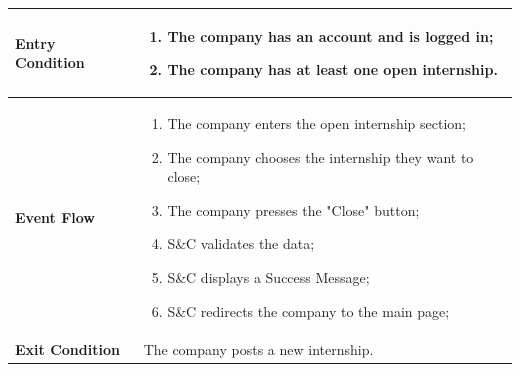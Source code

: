 \begin{enumerate}[label=\textbf{[US\arabic*]}, left = 0pt, align = left, resume]
\begin{longtable}{|l|p{11cm}|}
                \textbf{Entry Condition} & 
                    \begin{enumerate}[label=\textbullet, itemsep=0em]
                        \item The company has an account and is logged in;
                        \item The company has at least one open internship.
                    \end{enumerate} \\
                \hline 
                
                \textbf{Event Flow} &
                    \begin{enumerate}[label=\arabic*., itemsep=0.2em]
                        \item The company enters the open internship section;
                        \item The company chooses the internship they want to close;
                        \item The company presses the "Close" button;
                        \item S\&C validates the data;
                        \item S\&C displays a Success Message;
                        \item S\&C redirects the company to the main page;
                    \end{enumerate} \\
                \hline
                
                \textbf{Exit Condition} & 
                    The company posts a new internship. \\
                \hline
                

\end{longtable}
\end{enumerate}
